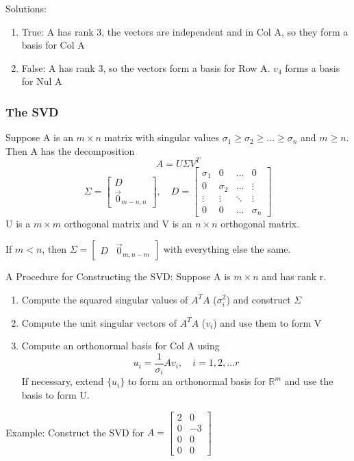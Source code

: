 \documentclass[12pt]{article} %
\newcommand{\R}{\mathbb{R}}
\begin{document}
{Solutions:
\begin{enumerate}
	\item True: A has rank 3, the vectors are independent and in Col A, so they form a basis for Col A
	\item False: A has rank 3, so the vectors form a basis for Row A. $v_4$ forms a basis for Nul A
\end{enumerate}

\subsubsection{The SVD}
Suppose A is an $m\times n$ matrix with singular values $\sigma_1 \geq \sigma_2 \geq ... \geq \sigma_n$ and $m \geq n$. Then A has the decomposition 
$$A = U \Sigma V^T$$
$$\Sigma = \begin{bmatrix}
	D\\
	\vec{0}_{m-n, n}
\end{bmatrix}, \quad D = \begin{bmatrix}
	\sigma_1 & 0 & ... & 0\\
	0 & \sigma_2 & ... & \vdots\\
	\vdots & \vdots & \ddots & \vdots\\
	0 & 0 & ... & \sigma_n
\end{bmatrix}$$
U is a $m \times m$ orthogonal matrix and V is an $n \times n$ orthogonal matrix.

If $m < n$, then $\Sigma = \begin{bmatrix}
	D & \vec{0}_{m, n-m}
\end{bmatrix}$ with everything else the same. 

A Procedure for Constructing the SVD:
Suppose A is $m \times n$ and has rank r.
\begin{enumerate}
	\item Compute the squared singular values of $A^T A$ ($\sigma_i^2$) and construct $\Sigma$
	\item Compute the unit singular vectors of $A^T A$ ($v_i$) and use them to form V
	\item Compute an orthonormal basis for Col A using
	$$u_i = \frac{1}{\sigma_i} A v_i, \quad i = 1, 2, ... r$$
	If necessary, extend $\{u_i\}$ to form an orthonormal basis for $\R^m$ and use the basis to form U.
\end{enumerate}

Example:
Construct the SVD for $A = \begin{bmatrix}
	2 & 0\\
	0 & -3\\
	0 & 0\\
	0 & 0
\end{bmatrix}$

}
\end{document}
